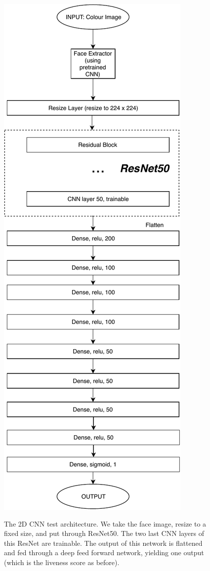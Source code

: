 \documentclass[10pt,a4paper]{article}
\begin{document}
        \begin{figure}
            \centering
            \includegraphics[width=0.6\linewidth]{2DCNNArchitecture.pdf}
            \label{2DCNNArchitecture}
            \caption{The 2D CNN test architecture. We take the face image, resize to a fixed size, and put through ResNet50. The two last CNN layers
            of this ResNet are trainable. The output of this network is flattened and fed through a deep feed forward network, yielding one output (which is the
            liveness score as before).}
        \end{figure}
\end{document}
